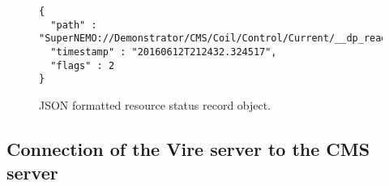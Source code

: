 \begin{figure}[h]
\vskip 10pt
\small
\begin{Verbatim}[frame=single,xleftmargin=0.cm,label=\fbox{JSON}]
{
  "path" : "SuperNEMO://Demonstrator/CMS/Coil/Control/Current/__dp_read__",
  "timestamp" : "20160612T212432.324517",
  "flags" : 2
}
\end{Verbatim}
\normalsize
\caption{JSON formatted resource status record object.}
\label{fig-app-payload-resource_status_record-json}
\end{figure}

\vfill
\pagebreak
\clearpage

\subsection{Connection of the Vire server to the CMS server}


